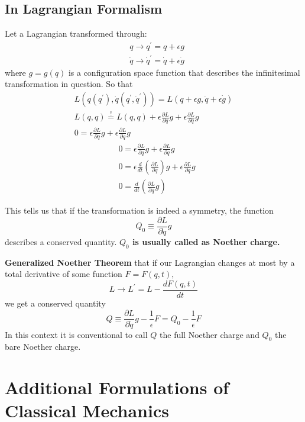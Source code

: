 \subsection{In Lagrangian Formalism}
Let a Lagrangian transformed through:
\begin{equation}
\begin{aligned}
&q \rightarrow q^{\prime}=q+\epsilon g\\
&\dot{q} \rightarrow \dot{q}^{\prime}=\dot{q}+\epsilon \dot{g}
\end{aligned}
\end{equation}
where $g=g(q)$ is a configuration space function that describes the infinitesimal transformation in question. So that
$$
\begin{array}{l}
{L\left(q\left(q^{\prime}\right), \dot{q}\left(q^{\prime}, \dot{q}^{\prime}\right)\right)=L(q+\epsilon g, \dot{q}+\epsilon \dot{g})} \\
{L(q, q) \stackrel{!}{=} L(q, q)+\epsilon \frac{\partial L}{\partial q} g+\epsilon \frac{\partial L}{\partial \dot{q}} g} \\
{0=\epsilon \frac{\partial L}{\partial q} g+\epsilon \frac{\partial L}{\partial q} g}
\end{array}
$$
$$
\begin{aligned}
&0=\epsilon \frac{\partial L}{\partial q} g+\epsilon \frac{\partial L}{\partial q} g\\
&0=\epsilon \frac{d}{d t}\left(\frac{\partial L}{\partial q}\right) g+\epsilon \frac{\partial L}{\partial q} g\\
&0=\frac{d}{d t}\left(\frac{\partial L}{\partial q} g\right)
\end{aligned}
$$
\begin{qt}
This tells us that if the transformation is indeed a symmetry, the function
\begin{equation}
Q_{0} \equiv \frac{\partial L}{\partial \dot{q}} g
\end{equation}
describes a conserved quantity. \textbf{$Q_0$ is usually called as Noether charge.}
\end{qt}
\begin{qt}
\textbf{Generalized Noether Theorem}
that if our Lagrangian changes at most by a total derivative of some function $F=F(q, t),$ 
$$
L \rightarrow L^{\prime}=L-\frac{d F(q, t)}{d t}
$$
we get a conserved quantity
\begin{equation}
Q \equiv \frac{\partial L}{\partial \dot{q}} g-\frac{1}{\epsilon} F = Q_{0}-\frac{1}{\epsilon} F
\end{equation}
In this context it is conventional to call $Q$ the full Noether charge and $Q_{0}$ the bare Noether charge.
\end{qt}

\section{Additional Formulations of Classical Mechanics}